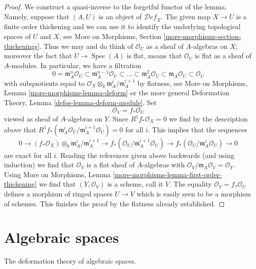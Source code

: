 \documentclass{stacks-project}
\theoremstyle{plain}
\theoremstyle{definition}
\theoremstyle{remark}
\numberwithin{equation}{subsection}
\def\Spec{\mathop{\mathrm{Spec}}}
\def\Deformationcategory{\mathcal{D}\!\mathit{ef}}
\begin{document}
\begin{proof}
We construct a quasi-inverse to the forgetful functor of the lemma.
Namely, suppose that $(A, U)$ is an object of $\Deformationcategory_X$.
The given map $X \to U$ is a finite order thickening and we can use
it to identify the underlying topological spaces of $U$ and $X$, see
More on Morphisms, Section \ref{more-morphisms-section-thickenings}.
Thus we may and do think of $\mathcal{O}_U$ as a sheaf of
$A$-algebras on $X$; moreover the fact that $U \to \Spec(A)$ is
flat, means that $\mathcal{O}_U$ is flat as a sheaf of $A$-modules.
In particular, we have a filtration
$$
0 = \mathfrak m_A^n\mathcal{O}_U \subset
\mathfrak m_A^{n - 1}\mathcal{O}_U \subset \ldots \subset
\mathfrak m_A^2\mathcal{O}_U \subset
\mathfrak m_A\mathcal{O}_U \subset \mathcal{O}_U
$$
with subquotients equal to
$\mathcal{O}_X \otimes_k \mathfrak m_A^i/\mathfrak m_A^{i + 1}$
by flatness, see More on Morphisms, Lemma \ref{more-morphisms-lemma-deform}
or the more general Deformation Theory, Lemma \ref{defos-lemma-deform-module}.
Set
$$
\mathcal{O}_V = f_*\mathcal{O}_U
$$
viewed as sheaf of $A$-algebras on $Y$. Since
$R^1f_*\mathcal{O}_X = 0$ we find by the description above that
$R^1f_*(\mathfrak m_A^i\mathcal{O}_U/\mathfrak m_A^{i + 1}\mathcal{O}_U) = 0$
for all $i$. This implies that the sequences
$$
0 \to
(f_*\mathcal{O}_X) \otimes_k \mathfrak m_A^i/\mathfrak m_A^{i + 1} \to
f_*(\mathcal{O}_U/\mathfrak m_A^{i + 1}\mathcal{O}_U) \to
f_*(\mathcal{O}_U/\mathfrak m_A^i\mathcal{O}_U) \to 0
$$
are exact for all $i$. Reading the references given above backwards
(and using induction) we find that $\mathcal{O}_V$ is a flat
sheaf of $A$-algebras with
$\mathcal{O}_V/\mathfrak m_A\mathcal{O}_V = \mathcal{O}_Y$.
Using More on Morphisms, Lemma
\ref{more-morphisms-lemma-first-order-thickening}
we find that $(Y, \mathcal{O}_V)$ is a scheme, call it $V$.
The equality $\mathcal{O}_V = f_*\mathcal{O}_U$ defines a
morphism of ringed spaces $U \to V$ which is easily seen to be
a morphism of schemes. This finishes the proof by the
flatness already established.
\end{proof}







\section{Algebraic spaces}
\label{section-algebraic-spaces}

\noindent
The deformation theory of algebraic spaces.
\end{document}
